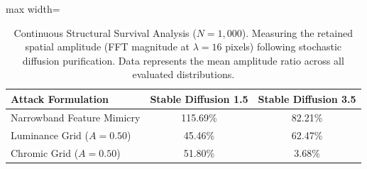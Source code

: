 \begin{table}[htbp]
\centering
\caption{Continuous Structural Survival Analysis ($N=1{,}000$). Measuring the retained spatial amplitude (FFT magnitude at $\lambda=16$ pixels) following stochastic diffusion purification. Data represents the mean amplitude ratio across all evaluated distributions.}
\label{tab:fft_survival}
\begin{adjustbox}{max width=\linewidth}
\begin{tabular}{@{}lcc@{}}
\toprule
\textbf{Attack Formulation} & \textbf{Stable Diffusion 1.5} & \textbf{Stable Diffusion 3.5} \\ \midrule
Narrowband Feature Mimicry & 115.69\% & 82.21\% \\
Luminance Grid ($A=0.50$) & 45.46\% & 62.47\% \\
Chromic Grid ($A=0.50$) & 51.80\% & 3.68\% \\ \bottomrule
\end{tabular}
\end{adjustbox}
\end{table}
